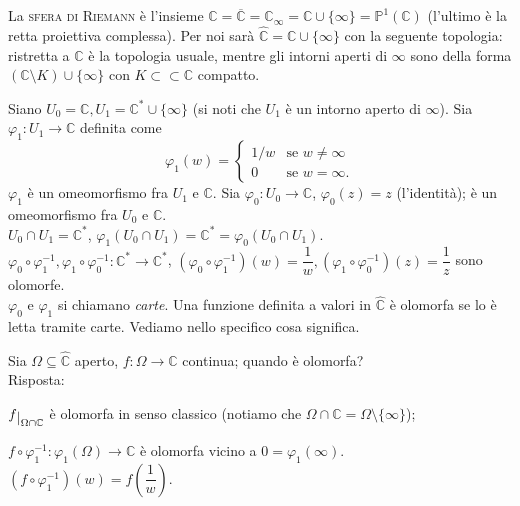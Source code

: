 \begin{defn}
  La \textsc{sfera di Riemann} è l'insieme $\hat{\mathbb{C}}=\overline{\mathbb{C}}=\mathbb{C}_{\infty}=\mathbb{C} \cup \{\infty\}=\mathbb{P}^1(\mathbb{C})$ (l'ultimo è la retta proiettiva complessa).
  Per noi sarà $\hat{\mathbb{C}}=\mathbb{C} \cup \{\infty\}$ con la seguente topologia: ristretta a $\mathbb{C}$ è la topologia usuale, mentre gli intorni aperti di $\infty$ sono della forma $(\mathbb{C} \setminus K) \cup \{\infty\}$ con $K \subset \subset \mathbb{C}$ compatto.
\end{defn}

Siano $U_0=\mathbb{C}, U_1=\mathbb{C}^*\cup\{\infty\}$ (si noti che $U_1$ è un intorno aperto di $\infty$). Sia $\varphi_1:U_1 \longrightarrow \mathbb{C}$ definita come
$$\varphi_1(w)=\begin{cases} 1/w & \mbox{se }w\not=\infty \\ 0 & \mbox{se }w=\infty. \end{cases}$$
$\varphi_1$ è un omeomorfismo fra $U_1$ e $\mathbb{C}$.
Sia $\varphi_0:U_0 \longrightarrow \mathbb{C}$, $\varphi_0(z)=z$ (l'identità); è un omeomorfismo fra $U_0$ e $\mathbb{C}$. \\
$U_0 \cap U_1=\mathbb{C}^*$, $\varphi_1(U_0 \cap U_1)=\mathbb{C}^*=\varphi_0(U_0 \cap U_1)$. \\
$\varphi_0 \circ \varphi_1^{-1}, \varphi_1 \circ \varphi_0^{-1}:\mathbb{C}^* \longrightarrow \mathbb{C}^*$,
$(\varphi_0 \circ \varphi_1^{-1})(w)=\dfrac{1}{w}, (\varphi_1 \circ \varphi_0^{-1})(z)=\dfrac{1}{z}$ sono olomorfe. \\
$\varphi_0$ e $\varphi_1$ si chiamano \textit{carte}. Una funzione definita a valori in $\hat{\mathbb{C}}$ è olomorfa se lo è letta tramite carte. Vediamo nello specifico cosa significa.

Sia $\Omega \subseteq \hat{\mathbb{C}}$ aperto, $f:\Omega \longrightarrow \mathbb{C}$ continua; quando è olomorfa? \\
Risposta:
\begin{nlist}
  \item $f \restrict{\Omega \cap \mathbb{C}}$ è olomorfa in senso classico (notiamo che $\Omega \cap \mathbb{C}=\Omega \setminus \{\infty\}$);
  \item $f \circ \varphi_1^{-1}:\varphi_1(\Omega) \longrightarrow \mathbb{C}$ è olomorfa vicino a $0=\varphi_1(\infty)$. \\
  $(f \circ \varphi_1^{-1})(w)=f\left(\dfrac{1}{w}\right)$.
\end{nlist}

